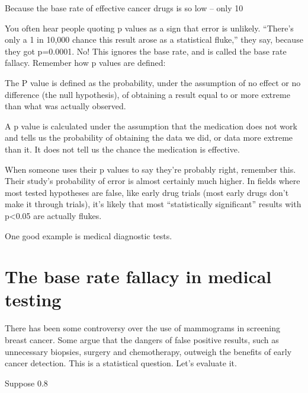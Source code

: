 Because the base rate of effective cancer drugs is so low – only 10%

You often hear people quoting p values as a sign that error is unlikely. “There’s only a 1 in 10,000 chance this result arose as a statistical fluke,” they say, because they got p=0.0001. No! This ignores the base rate, and is called the base rate fallacy. Remember how p values are defined:

    The P value is defined as the probability, under the assumption of no effect or no difference (the null hypothesis), of obtaining a result equal to or more extreme than what was actually observed.

A p value is calculated under the assumption that the medication does not work and tells us the probability of obtaining the data we did, or data more extreme than it. It does not tell us the chance the medication is effective.

When someone uses their p values to say they’re probably right, remember this. Their study’s probability of error is almost certainly much higher. In fields where most tested hypotheses are false, like early drug trials (most early drugs don’t make it through trials), it’s likely that most “statistically significant” results with p<0.05 are actually flukes.

One good example is medical diagnostic tests.

\section{The base rate fallacy in medical testing}
\label{term:base-rateF}

There has been some controversy over the use of mammograms in screening breast cancer. Some argue that the dangers of false positive results, such as unnecessary biopsies, surgery and chemotherapy, outweigh the benefits of early cancer detection. This is a statistical question. Let’s evaluate it.

Suppose 0.8%

